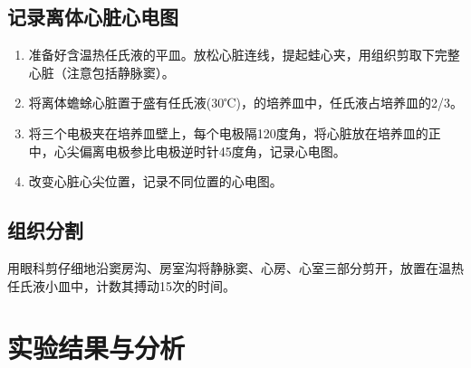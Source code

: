 \documentclass[UTF8]{article}
\begin{document}
    \subsection{记录离体心脏心电图}
    \begin{enumerate}
      \item 准备好含温热任氏液的平皿。放松心脏连线，提起蛙心夹，用组织剪取下完整心脏（注意包括静脉窦）。
      \item 将离体蟾蜍心脏置于盛有任氏液(30℃)，的培养皿中，任氏液占培养皿的2/3。
      \item 将三个电极夹在培养皿壁上，每个电极隔120度角，将心脏放在培养皿的正中，心尖偏离电极参比电极逆时针45度角，记录心电图。
      \item 改变心脏心尖位置，记录不同位置的心电图。      
    \end{enumerate}
    \subsection{组织分割}
    用眼科剪仔细地沿窦房沟、房室沟将静脉窦、心房、心室三部分剪开，放置在温热任氏液小皿中，计数其搏动15次的时间。
    \section{实验结果与分析}
\end{document}
